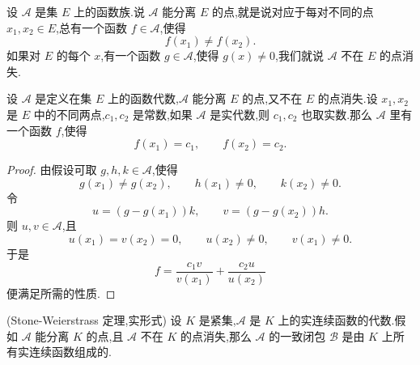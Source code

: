 \begin{definition}
	设 $\mathscr{A}$ 是集 $E$ 上的函数族.说 $\mathscr{A}$ 能分离 $E$ 的点,就是说对应于每对不同的点 $x_1,x_2\in E$,总有一个函数 $f\in\mathscr{A}$,使得
	\[
	f(x_1)\neq f(x_2).
	\]
	如果对 $E$ 的每个 $x$,有一个函数 $g\in\mathscr{A}$,使得 $g(x)\neq0$,我们就说 $\mathscr{A}$ 不在 $E$ 的点消失.
\end{definition}

\begin{proposition}\label{两点插值引理}
	设 $\mathscr{A}$ 是定义在集 $E$ 上的函数代数,$\mathscr{A}$ 能分离 $E$ 的点,又不在 $E$ 的点消失.设 $x_1,x_2$ 是 $E$ 中的不同两点,$c_1,c_2$ 是常数,如果 $\mathscr{A}$ 是实代数,则 $c_1,c_2$ 也取实数.那么 $\mathscr{A}$ 里有一个函数 $f$,使得
	\[
	f(x_1)=c_1,
	\qquad
	f(x_2)=c_2.
	\]
\end{proposition}

\begin{proof}
	由假设可取 $g,h,k\in\mathscr{A}$,使得
	\[
	g(x_1)\neq g(x_2),
	\qquad
	h(x_1)\neq0,
	\qquad
	k(x_2)\neq0.
	\]
	令
	\[
	u=(g-g(x_1))k,
	\qquad
	v=(g-g(x_2))h.
	\]
	则 $u,v\in\mathscr{A}$,且
	\[
	u(x_1)=v(x_2)=0,
	\qquad
	u(x_2)\neq0,
	\qquad
	v(x_1)\neq0.
	\]
	于是
	\[
	f=\frac{c_1v}{v(x_1)}+\frac{c_2u}{u(x_2)}
	\]
	便满足所需的性质.
\end{proof}

\begin{theorem}(Stone-Weierstrass 定理,实形式)\label{Stone-Weierstrass实形式}
	设 $K$ 是紧集,$\mathscr{A}$ 是 $K$ 上的实连续函数的代数.假如 $\mathscr{A}$ 能分离 $K$ 的点,且 $\mathscr{A}$ 不在 $K$ 的点消失,那么 $\mathscr{A}$ 的一致闭包 $\mathscr{B}$ 是由 $K$ 上所有实连续函数组成的.
\end{theorem}


